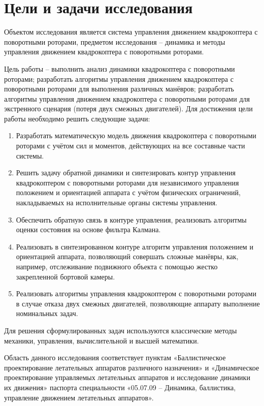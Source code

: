 \section{Цели и задачи исследования}

Объектом исследования является система управления движением квадрокоптера с поворотными роторами, предметом исследования -- динамика и методы управления движением квадрокоптера с поворотными роторами.

Цель работы -- выполнить анализ динамики квадрокоптера с поворотными роторами;
разработать алгоритмы управления движением квадрокоптера с поворотными роторами для выполнения различных манёвров; разработать алгоритмы управления движением квадрокоптера с поворотными роторами для экстренного сценария (потеря двух смежных двигателей). Для достижения цели работы необходимо решить следующие задачи:
\begin{enumerate}
	\item Разработать математическую модель движения квадрокоптера с поворотными роторами с учётом сил и моментов, действующих на все составные части системы.
	\item Решить задачу обратной динамики и синтезировать контур управления квадрокоптером с поворотными роторами для независимого управления положением и ориентацией аппарата с учётом физических ограничений, накладываемых на исполнительные органы системы управления.
	\item Обеспечить обратную связь в контуре управления, реализовать алгоритмы оценки состояния на основе фильтра Калмана.
	\item Реализовать в синтезированном контуре алгоритм управления положением и ориентацией аппарата, позволяющий совершать сложные манёвры, как, например, отслеживание подвижного объекта с помощью жестко закрепленной бортовой камеры.
	\item Реализовать алгоритмы управления квадрокоптером с поворотными роторами в случае отказа двух смежных двигателей, позволяющие аппарату выполнение номинальных задач.
\end{enumerate}
Для решения сформулированных задач используются классические методы механики, управления, вычислительной и высшей математики.

Область данного исследования соответствует пунктам «Баллистическое проектирование летательных аппаратов различного назначения» и «Динамическое проектирование управляемых летательных аппаратов и исследование динамики их движения» паспорта специальности «05.07.09 – Динамика, баллистика, управление движением летательных аппаратов».

